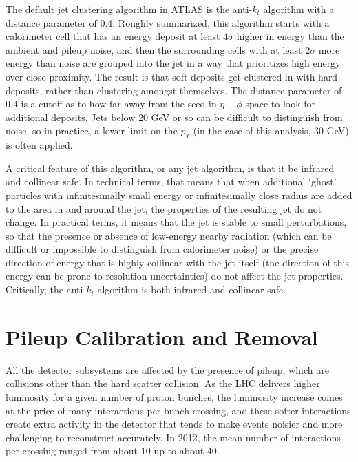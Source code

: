 The default jet clustering algorithm in ATLAS is the anti-$k_t$ algorithm with a distance parameter of 0.4.  Roughly summarized, this algorithm starts with a calorimeter cell that has an energy deposit at least $4\sigma$ higher in energy than the ambient and pileup noise, and then the surrounding cells with at least $2\sigma$ more energy than noise are grouped into the jet in a way that prioritizes high energy over close proximity.  The result is that soft deposits get clustered in with hard deposits, rather than clustering amongst themselves.  The distance parameter of 0.4 is a cutoff as to how far away from the seed in $\eta-\phi$ space to look for additional deposits.   Jets below 20 GeV or so can be difficult to distinguish from noise, so in practice, a lower limit on the $p_T$ (in the case of this analysis, 30 GeV) is often applied.  

A critical feature of this algorithm, or any jet algorithm, is that it be infrared and collinear safe.  In technical terms, that means that when additional `ghost' particles with infinitesimally small energy or infinitesimally close radius are added to the area in and around the jet, the properties of the resulting jet do not change.  In practical terms, it means that the jet is stable to small perturbations, so that the presence or absence of low-energy nearby radiation (which can be difficult or impossible to distinguish from calorimeter noise) or the precise direction of energy that is highly collinear with the jet itself (the direction of this energy can be prone to resolution uncertainties) do not affect the jet properties.  Critically, the anti-$k_t$ algorithm is both infrared and collinear safe.








\section{Pileup Calibration and Removal}
\label{sec:pileup}
All the detector subsystems are affected by the presence of pileup, which are collisions other than the hard scatter collision.  As the LHC delivers higher luminosity for a given number of proton bunches, the luminosity increase comes at the price of many interactions per bunch crossing, and these softer interactions create extra activity in the detector that tends to make events noisier and more challenging to reconstruct accurately.  In 2012, the mean number of interactions per crossing ranged from about 10 up to about 40.  

